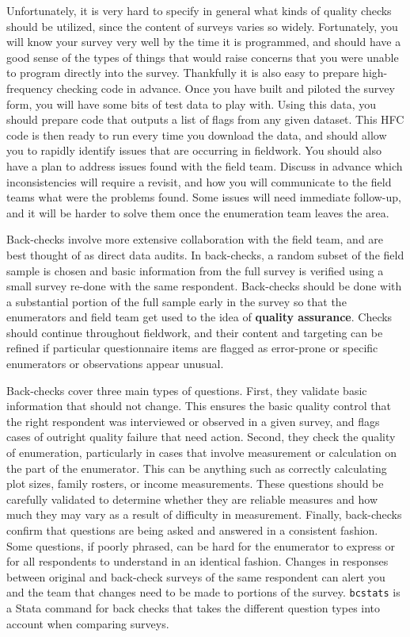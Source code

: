 Unfortunately, it is very hard to specify in general
what kinds of quality checks should be utilized,
since the content of surveys varies so widely.
Fortunately, you will know your survey very well
by the time it is programmed, and should have a good sense
of the types of things that would raise concerns
that you were unable to program directly into the survey.
Thankfully it is also easy to prepare high-frequency checking code in advance.
Once you have built and piloted the survey form,
you will have some bits of test data to play with.
Using this data, you should prepare code that outputs
a list of flags from any given dataset.
This HFC code is then ready to run every time you download the data,
and should allow you to rapidly identify issues
that are occurring in fieldwork.
You should also have a plan to address issues found with the field team.
Discuss in advance which inconsistencies will require a revisit,
and how you will communicate to the field teams what were the problems found.
Some issues will need immediate follow-up,
and it will be harder to solve them once the enumeration team leaves the area.

Back-checks
involve more extensive collaboration with the field team,
and are best thought of as direct data audits.
In back-checks, a random subset of the field sample is chosen
and basic information from the full survey is verified
using a small survey re-done with the same respondent.
Back-checks should be done with a substantial portion
of the full sample early in the survey
so that the enumerators and field team
get used to the idea of \textbf{quality assurance}.
Checks should continue throughout fieldwork,
and their content and targeting can be refined if particular
questionnaire items are flagged as error-prone
or specific enumerators or observations appear unusual.

Back-checks cover three main types of questions.
First, they validate basic information that should not change.
This ensures the basic quality control that the right respondent
was interviewed or observed in a given survey,
and flags cases of outright quality failure that need action.
Second, they check the quality of enumeration,
particularly in cases that involve measurement or calculation
on the part of the enumerator.
This can be anything such as correctly calculating plot sizes,
family rosters, or income measurements.
These questions should be carefully validated
to determine whether they are reliable measures
and how much they may vary as a result of difficulty in measurement.
Finally, back-checks confirm that questions are being asked and answered
in a consistent fashion. Some questions, if poorly phrased,
can be hard for the enumerator to express or for all respondents
to understand in an identical fashion.
Changes in responses between original and back-check surveys
of the same respondent
can alert you and the team that changes need to be made
to portions of the survey.
\texttt{bcstats} is a Stata command for back checks
that takes the different question types into account when comparing surveys.

